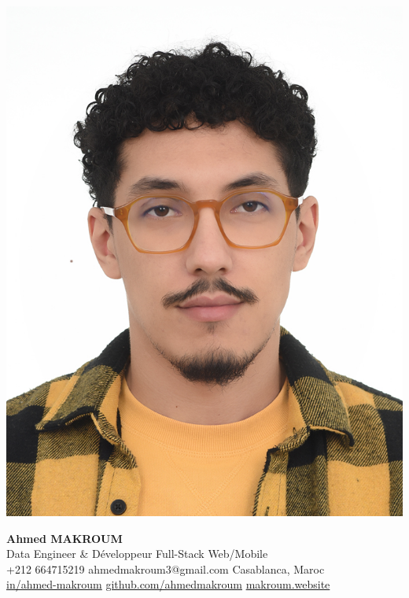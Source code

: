 \documentclass[10pt,a4paper,sans]{moderncv}
\begin{document}
\hspace*{0.03\textwidth}%
\begin{minipage}[c]{0.13\textwidth}
  \includegraphics[width=0.85\linewidth]{images/ahmed.jpg}
\end{minipage}%
\hfill
\begin{minipage}[c]{0.84\textwidth}
  \begin{center}
    {\fontsize{20}{22}\selectfont\textbf{Ahmed MAKROUM}}\\[0.7em]
    {\fontsize{13.2}{15.4}\selectfont Data Engineer \& Développeur Full-Stack Web/Mobile} \\[0.5em] %
    {\fontsize{10.5}{12.3}\selectfont
      \faMobile\enspace +212 664715219 \quad
      \faEnvelope\enspace ahmedmakroum3@gmail.com \quad
      \faHome\enspace Casablanca, Maroc \\
      \faLinkedin\enspace \href{https://www.linkedin.com/in/ahmed-makroum/}{in/ahmed-makroum} \quad
      \faGithub\enspace \href{https://github.com/ahmedmakroum}{github.com/ahmedmakroum}
      \faGlobe\enspace \href{https://makroum.website}{makroum.website}
    }\\[1em]
  \end{center}
\end{minipage}
\vspace{-14pt}
\end{document}
